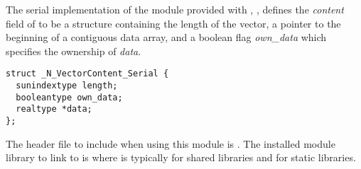
The serial implementation of the {\nvector} module provided with {\sundials},
{\nvecs}, defines the {\em content} field of  to be a structure 
containing the length of the vector, a pointer to the beginning of a contiguous 
data array, and a boolean flag {\em own\_data} which specifies the ownership 
of {\em data}.
\begin{verbatim} 
struct _N_VectorContent_Serial {
  sunindextype length;
  booleantype own_data;
  realtype *data;
};
\end{verbatim}

The header file to include when using this module is .
The installed module library to link to is
where  is typically  for shared libraries and 
for static libraries.

